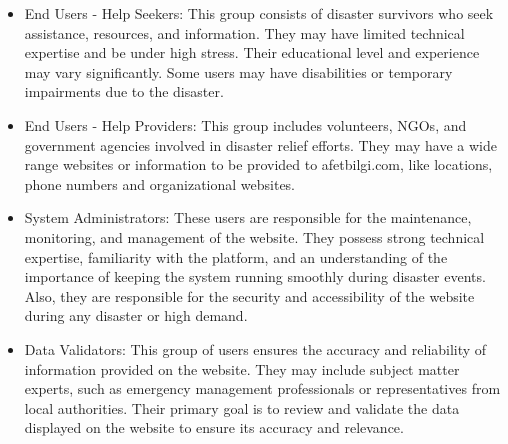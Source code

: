 \documentclass[11pt,a4paper]{article}
\begin{document}
\begin{itemize}
    \item End Users - Help Seekers: This group consists of disaster survivors who seek assistance, resources, and information. They may have limited technical expertise and be under high stress. Their educational level and experience may vary significantly. Some users may have disabilities or temporary impairments due to the disaster.
    \item End Users - Help Providers: This group includes volunteers, NGOs, and government agencies involved in disaster relief efforts. They may have a wide range websites or information to be provided to afetbilgi.com, like locations, phone numbers and organizational websites. 
    \item System Administrators: These users are responsible for the maintenance, monitoring, and management of the website. They possess strong technical expertise, familiarity with the platform, and an understanding of the importance of keeping the system running smoothly during disaster events. Also, they are responsible for the security and accessibility of the website during any disaster or high demand.
    \item Data Validators: This group of users ensures the accuracy and reliability of information provided on the website. They may include subject matter experts, such as emergency management professionals or representatives from local authorities. Their primary goal is to review and validate the data displayed on the website to ensure its accuracy and relevance.
\end{itemize}
\end{document}
